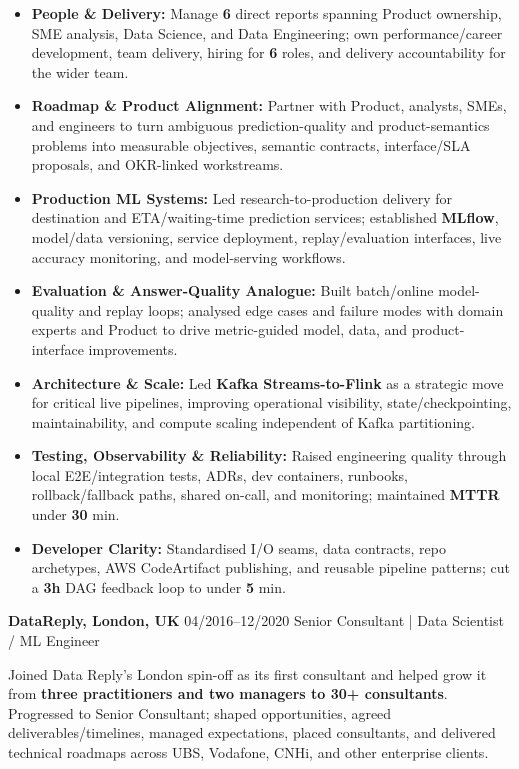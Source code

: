 \documentclass[]{../../../../friggeri-cv}
\renewcommand{\entry}[4]{%
  \parbox[t]{\dimexpr\textwidth-\entryleftinset\relax}{%
    \textbf{#2}%
    {\footnotesize\addfontfeature{Color=lightgray}\hspace{0.6em}#1}%
    \hfill%
    {\small\color{textcolor} #3}\\%
    #4\vspace{\parsep}%
  }\\}
\begin{document}
\begin{entrylist}
{{        }
        \begin{itemize}[leftmargin=1.1em]
            \item \footnotesize\textbf{People \& Delivery:} Manage \textbf{6} direct reports spanning Product ownership, SME analysis, Data Science, and Data Engineering; own performance/career development, team delivery, hiring for \textbf{6} roles, and delivery accountability for the wider team.
            \item \footnotesize\textbf{Roadmap \& Product Alignment:} Partner with Product, analysts, SMEs, and engineers to turn ambiguous prediction-quality and product-semantics problems into measurable objectives, semantic contracts, interface/SLA proposals, and OKR-linked workstreams.
            \item \footnotesize\textbf{Production ML Systems:} Led research-to-production delivery for destination and ETA/waiting-time prediction services; established \textbf{MLflow}, model/data versioning, service deployment, replay/evaluation interfaces, live accuracy monitoring, and model-serving workflows.
            \item \footnotesize\textbf{Evaluation \& Answer-Quality Analogue:} Built batch/online model-quality and replay loops; analysed edge cases and failure modes with domain experts and Product to drive metric-guided model, data, and product-interface improvements.
            \item \footnotesize\textbf{Architecture \& Scale:} Led \textbf{Kafka Streams-to-Flink} as a strategic move for critical live pipelines, improving operational visibility, state/checkpointing, maintainability, and compute scaling independent of Kafka partitioning.
            \item \footnotesize\textbf{Testing, Observability \& Reliability:} Raised engineering quality through local E2E/integration tests, ADRs, dev containers, runbooks, rollback/fallback paths, shared on-call, and monitoring; maintained \textbf{MTTR} under \textbf{30} min.
            \item \footnotesize\textbf{Developer Clarity:} Standardised I/O seams, data contracts, repo archetypes, AWS CodeArtifact publishing, and reusable pipeline patterns; cut a \textbf{3h} DAG feedback loop to under \textbf{5} min.
        \end{itemize}
    }
    \entry
    {04/2016--12/2020}
    {DataReply, London, UK}
    {Senior Consultant | Data Scientist / ML Engineer}
    {
        {\small
        \setlength{\parindent}{0pt}
        \setlength{\leftskip}{0pt}
        Joined Data Reply's London spin-off as its first consultant and helped grow it from \textbf{three practitioners and two managers to 30+ consultants}. Progressed to Senior Consultant; shaped opportunities, agreed deliverables/timelines, managed expectations, placed consultants, and delivered technical roadmaps across UBS, Vodafone, CNHi, and other enterprise clients.

}}
\end{entrylist}
\end{document}

